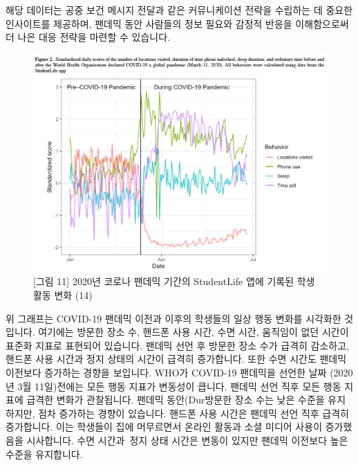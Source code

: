 \documentclass[
  letterpaper,
]{book}
\begin{document}
해당 데이터는 공중 보건 메시지 전달과 같은 커뮤니케이션 전략을 수립하는
데 중요한 인사이트를 제공하며, 팬데믹 동안 사람들의 정보 필요와 감정적
반응을 이해함으로써 더 나은 대응 전략을 마련할 수 있습니다.

\begin{figure}[H]

{\centering \includegraphics{img/fig11.png}

}

\caption{{[}그림 11{]} 2020년 코로나 팬데믹 기간의 StudentLife 앱에
기록된 학생 활동 변화 (14)}

\end{figure}%

위 그래프는 COVID-19 팬데믹 이전과 이후의 학생들의 일상 행동 변화를
시각화한 것입니다. 여기에는 방문한 장소 수, 핸드폰 사용 시간, 수면 시간,
움직임이 없던 시간이 표준화 지표로 표현되어 있습니다. 팬데믹 선언 후
방문한 장소 수가 급격히 감소하고, 핸드폰 사용 시간과 정지 상태의 시간이
급격히 증가합니다. 또한 수면 시간도 팬데믹 이전보다 증가하는 경향을
보입니다. WHO가 COVID-19 팬데믹을 선언한 날짜 (2020년 3월 11일)전에는
모든 행동 지표가 변동성이 큽니다. 팬데믹 선언 직후 모든 행동 지표에
급격한 변화가 관찰됩니다. 팬데믹 동안(Dur방문한 장소 수는 낮은 수준을
유지하지만, 점차 증가하는 경향이 있습니다. 핸드폰 사용 시간은 팬데믹
선언 직후 급격히 증가합니다. 이는 학생들이 집에 머무르면서 온라인 활동과
소셜 미디어 사용이 증가했음을 시사합니다. 수면 시간과~정지 상태 시간은
변동이 있지만 팬데믹 이전보다 높은 수준을 유지합니다.
\end{document}
